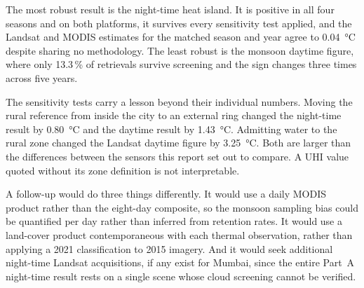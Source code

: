 \documentclass[11pt,a4paper]{article}
\begin{document}
The most robust result is the night-time heat island. It is positive
in all four seasons and on both platforms, it survives every
sensitivity test applied, and the Landsat and MODIS estimates for the
matched season and year agree to \SI{0.04}{\degreeCelsius} despite
sharing no methodology. The least robust is the monsoon daytime
figure, where only 13.3\,\% of retrievals survive screening and the
sign changes three times across five years.

The sensitivity tests carry a lesson beyond their individual numbers.
Moving the rural reference from inside the city to an external ring
changed the night-time result by \SI{0.80}{\degreeCelsius} and the
daytime result by \SI{1.43}{\degreeCelsius}. Admitting water to the
rural zone changed the Landsat daytime figure by
\SI{3.25}{\degreeCelsius}. Both are larger than the differences
between the sensors this report set out to compare. A UHI value quoted
without its zone definition is not interpretable.

A follow-up would do three things differently. It would use a daily
MODIS product rather than the eight-day composite, so the monsoon
sampling bias could be quantified per day rather than inferred from
retention rates. It would use a land-cover product contemporaneous
with each thermal observation, rather than applying a 2021
classification to 2015 imagery. And it would seek additional
night-time Landsat acquisitions, if any exist for Mumbai, since the
entire Part~A night-time result rests on a single scene whose cloud
screening cannot be verified.

\end{document}
